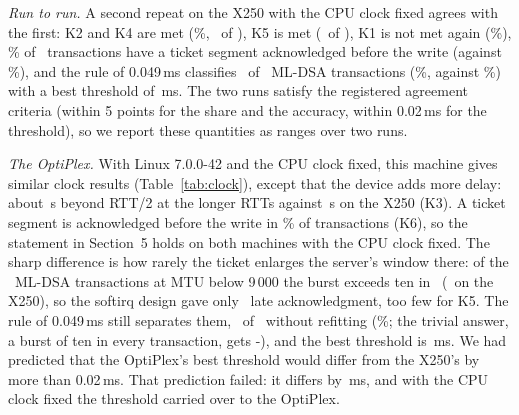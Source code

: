 \documentclass[9pt]{article}
\newcommand{\ms}{\,ms\xspace}
\begin{document}
\emph{Run to run.} A second repeat on the X250 with the CPU clock fixed agrees with the first: K2 and K4 are met (\RqKTwoPct\%, \RqKFourRight\ of \RqKFourN), K5 is met (\RqKFiveRight\ of \RqKFiveN), K1 is not met again (\RqKOnePct\%), \RqKSixPct\% of \RqKSixN\ transactions have a ticket segment acknowledged before the write (against \RpKSixPct\%), and the rule of 0.049\ms classifies \RqKSevenRight\ of \RqKSevenN\ ML-DSA transactions (\RqKSevenPct\%, against \RpKSevenPct\%) with a best threshold of \RqKSevenBestLo\ms. The two runs satisfy the registered agreement criteria (within 5 points for the share and the accuracy, within 0.02\ms for the threshold), so we report these quantities as ranges over two runs.

\emph{The OptiPlex.} With Linux 7.0.0-42 and the CPU clock fixed, this machine gives similar clock results (Table~\ref{tab:clock}), except that the device adds more delay: about \RoKThreeMed\,\textmu s beyond RTT/2 at the longer RTTs against \RpKThreeMed\,\textmu s on the X250 (K3). A ticket segment is acknowledged before the write in \RoKSixPct\% of transactions (K6), so the statement in Section~5 holds on both machines with the CPU clock fixed. The sharp difference is how rarely the ticket enlarges the server's window there: of the \RoKSevenN\ ML-DSA transactions at MTU below 9\,000 the burst exceeds ten in \RoKSevenPos\ (\RpKSevenPos\ on the X250), so the softirq design gave only \RoKFiveN\ late acknowledgment, too few for K5. The rule of 0.049\ms still separates them, \RoKSevenRight\ of \RoKSevenN\ without refitting (\RoKSevenPct\%; the trivial answer, a burst of ten in every transaction, gets \the\numexpr\RoKSevenN-\RoKSevenPos\relax), and the best threshold is \RoKSevenBestLo\ms. We had predicted that the OptiPlex's best threshold would differ from the X250's by more than 0.02\ms. That prediction failed: it differs by \RoKSevenDiff\ms, and with the CPU clock fixed the threshold carried over to the OptiPlex.
\end{document}
